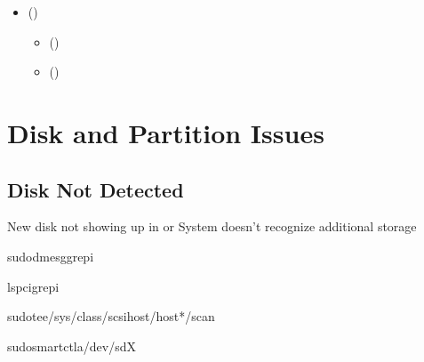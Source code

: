 \documentclass[letterpaper,10pt,english]{sphinxmanual}
\begin{document}
\begin{sphinxcontents}
\begin{itemize}
\begin{itemize}
\end{itemize}

\item {} 
\sphinxAtStartPar
{}\label{\detokenize{troubleshooting:id33}}{\hyperref[\detokenize{troubleshooting:advanced-debugging}]{}} ()
\begin{itemize}
\item {} 
\sphinxAtStartPar
{}\label{\detokenize{troubleshooting:id34}}{\hyperref[\detokenize{troubleshooting:kernel-debugging}]{}} ()

\item {} 
\sphinxAtStartPar
{}\label{\detokenize{troubleshooting:id35}}{\hyperref[\detokenize{troubleshooting:hardware-diagnostics}]{}} ()

\end{itemize}

\end{itemize}
\end{sphinxcontents}


\section{Disk and Partition Issues}
\label{\detokenize{troubleshooting:disk-and-partition-issues}}

\subsection{Disk Not Detected}
\label{\detokenize{troubleshooting:disk-not-detected}}
\sphinxAtStartPar
{}
\sphinxhyphen{} New disk not showing up in  or 
\sphinxhyphen{} System doesn’t recognize additional storage

\sphinxAtStartPar
{}

\begin{sphinxVerbatim}[commandchars=\\\{\}]
sudodmesggrep\PYGZhy{}i

lspcigrep\PYGZhy{}i

sudotee/sys/class/scsi\PYGZus{}host/host*/scan

sudosmartctl\PYGZhy{}a/dev/sdX
\end{sphinxVerbatim}
\end{document}
